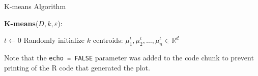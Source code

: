 \documentclass[
]{article}
\begin{document}
\begin{algorithm}[ht!]
\LinesNumbered %
\caption{K-means Algorithm}

\textbf{K-means}($D, k, \varepsilon$): {
  
  $t \leftarrow 0$\;
  Randomly initialize $k$ centroids: $\mu_{1}^{t}, \mu_{2}^{t}, \ldots, \mu_{n}^{t} \in \mathbb{R}^d$\;
}
\end{algorithm}

Note that the \texttt{echo\ =\ FALSE} parameter was added to the code
chunk to prevent printing of the R code that generated the plot.
\end{document}
